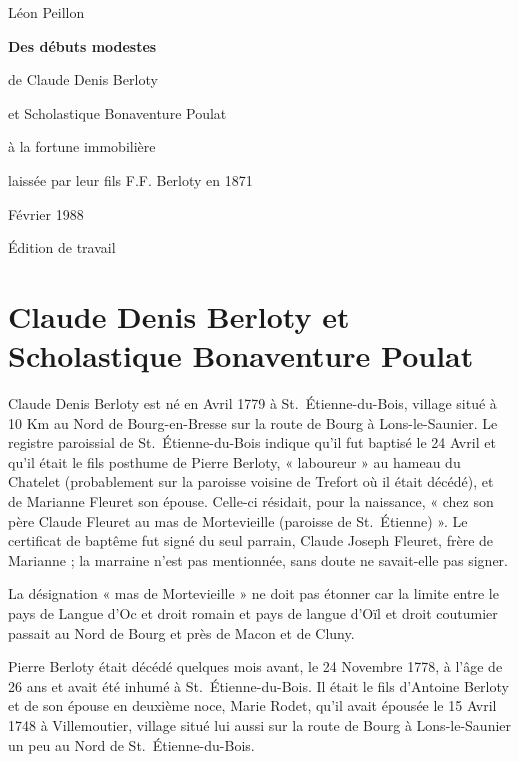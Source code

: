 \documentclass[11pt,a4paper]{report}
\providecommand{\releaseversion}{Édition de travail}
\begin{document}
\begin{titlepage}
\centering
\vspace*{1.8cm}
{\Large Léon Peillon\par}
\vspace{1.8cm}
{\LARGE\bfseries Des débuts modestes\par de Claude Denis Berloty\par et Scholastique Bonaventure Poulat\par à la fortune immobilière\par laissée par leur fils F.F. Berloty en 1871\par}
\vfill
{\large Février 1988\par}
\vspace{1cm}
{\small \releaseversion\par}
\end{titlepage}
\tableofcontents
\clearpage
\chapter{Claude Denis Berloty et Scholastique Bonaventure Poulat}\label{claude-denis-berloty-et-scholastique-bonaventure-poulat}


Claude Denis Berloty est né en Avril 1779 à St.~Étienne-du-Bois, village situé à 10 Km au Nord de Bourg-en-Bresse sur la route de Bourg à Lons-le-Saunier. Le registre paroissial de St.~Étienne-du-Bois indique qu'il fut baptisé le 24 Avril et qu'il était le fils posthume de Pierre Berloty, « laboureur » au hameau du Chatelet (probablement sur la paroisse voisine de Trefort où il était décédé), et de Marianne Fleuret son épouse. Celle-ci résidait, pour la naissance, « chez son père Claude Fleuret au mas de Mortevieille (paroisse de St.~Étienne) ». Le certificat de baptême fut signé du seul parrain, Claude Joseph Fleuret, frère de Marianne ; la marraine n'est pas mentionnée, sans doute ne savait-elle pas signer.

La désignation « mas de Mortevieille » ne doit pas étonner car la limite entre le pays de Langue d'Oc et droit romain et pays de langue d'Oïl et droit coutumier passait au Nord de Bourg et près de Macon et de Cluny.

Pierre Berloty était décédé quelques mois avant, le 24 Novembre 1778, à l'âge de 26 ans et avait été inhumé à St.~Étienne-du-Bois. Il était le fils d'Antoine Berloty et de son épouse en deuxième noce, Marie Rodet, qu'il avait épousée le 15 Avril 1748 à Villemoutier, village situé lui aussi sur la route de Bourg à Lons-le-Saunier un peu au Nord de St.~Étienne-du-Bois.
\end{document}
